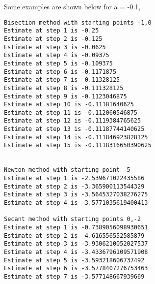 \documentclass[letterpaper]{exam}
\begin{document}
\begin{questions}
\begin{solution}
Some examples are shown below for a = -0.1,
\begin{verbatim}
Bisection method with starting points -1,0
Estimate at step 1 is -0.25
Estimate at step 2 is -0.125
Estimate at step 3 is -0.0625
Estimate at step 4 is -0.09375
Estimate at step 5 is -0.109375
Estimate at step 6 is -0.1171875
Estimate at step 7 is -0.11328125
Estimate at step 8 is -0.111328125
Estimate at step 9 is -0.1123046875
Estimate at step 10 is -0.11181640625
Estimate at step 11 is -0.112060546875
Estimate at step 12 is -0.1119384765625
Estimate at step 13 is -0.11187744140625
Estimate at step 14 is -0.111846923828125
Estimate at step 15 is -0.1118316650390625


Newton method with starting point -5
Estimate at step 1 is -2.539671022435586
Estimate at step 2 is -3.365900113544329
Estimate at step 3 is -3.5645327038276275
Estimate at step 4 is -3.5771035619400413

Secant method with starting points 0,-2
Estimate at step 1 is -0.7389056098930651
Estimate at step 2 is -4.616556552585879
Estimate at step 3 is -3.9306210052027537
Estimate at step 4 is -3.4336796109571908
Estimate at step 5 is -3.593218606737492
Estimate at step 6 is -3.5778407276753463
Estimate at step 7 is -3.577148667939669
\end{verbatim}
\end{solution}
\end{questions}
\end{document}
